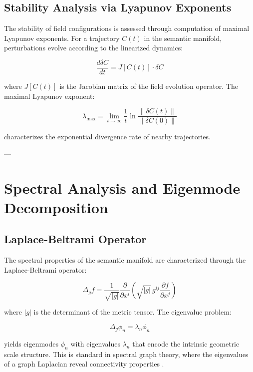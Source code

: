 \subsection{Stability Analysis via Lyapunov Exponents}

The stability of field configurations is assessed through computation of maximal Lyapunov exponents. For a trajectory $C(t)$ in the semantic manifold, perturbations evolve according to the linearized dynamics:

\begin{equation}
\frac{d\delta C}{dt} = J[C(t)] \cdot \delta C
\end{equation}

where $J[C(t)]$ is the Jacobian matrix of the field evolution operator. The maximal Lyapunov exponent:

\begin{equation}
\lambda_{\max} = \lim_{t \to \infty} \frac{1}{t} \ln \frac{\|\delta C(t)\|}{\|\delta C(0)\|}
\end{equation}

characterizes the exponential divergence rate of nearby trajectories.

---

\section{Spectral Analysis and Eigenmode Decomposition}

\subsection{Laplace-Beltrami Operator}

The spectral properties of the semantic manifold are characterized through the Laplace-Beltrami operator:

\begin{equation}
\Delta_g f = \frac{1}{\sqrt{|g|}} \frac{\partial}{\partial x^i} \left(\sqrt{|g|} \, g^{ij} \frac{\partial f}{\partial x^j}\right)
\end{equation}

where $|g|$ is the determinant of the metric tensor. The eigenvalue problem:

\begin{equation}
\Delta_g \phi_n = \lambda_n \phi_n
\end{equation}

yields eigenmodes $\phi_n$ with eigenvalues $\lambda_n$ that encode the intrinsic geometric scale structure. This is standard in spectral graph theory, where the eigenvalues of a graph Laplacian reveal connectivity properties \autocite{Chung1997}.

